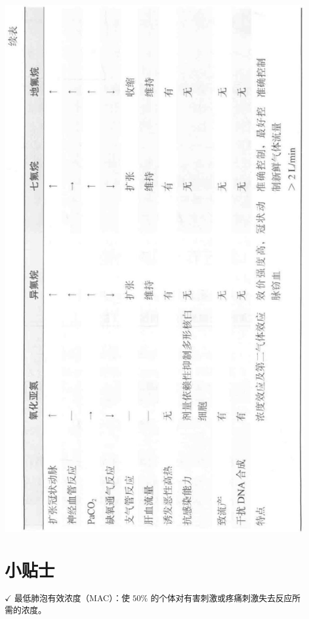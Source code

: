 \documentclass[10pt]{article}
\begin{document}
\begin{center}
\includegraphics[max width=\textwidth]{2024_07_05_645bb794a4d4f32ee0c8g-335}
\end{center}

\section*{小贴士}
$\checkmark$ 最低肺泡有效浓度（MAC）：使 $50 \%$ 的个体对有害刺激或疼痛刺激失去反应所需的浓度。
\end{document}
